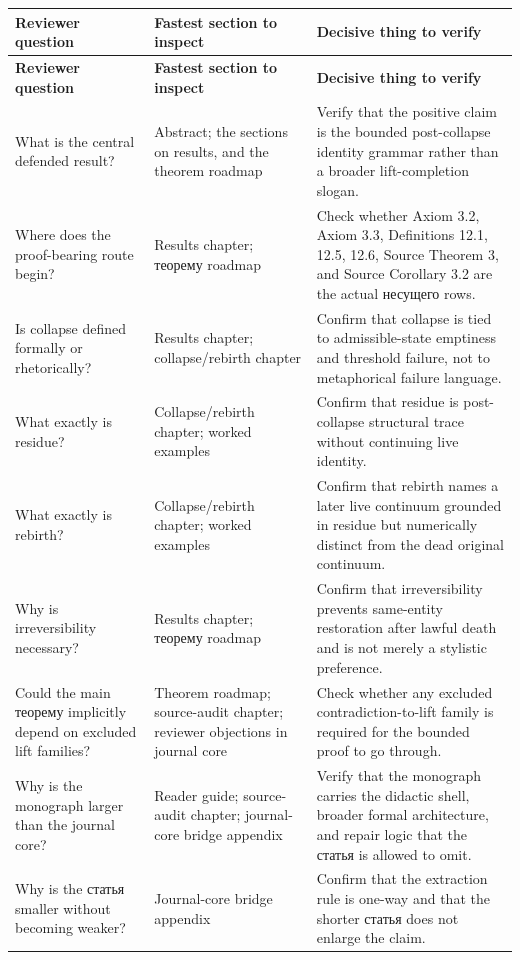 \begin{longtable}{p{3.4cm} p{4.4cm} p{5.7cm}}
\toprule
\textbf{Reviewer question} & \textbf{Fastest section to inspect} & \textbf{Decisive thing to verify} \\
\midrule
\endfirsthead
\toprule
\textbf{Reviewer question} & \textbf{Fastest section to inspect} & \textbf{Decisive thing to verify} \\
\midrule
\endhead
\bottomrule
\endfoot
What is the central defended result? & Abstract; the sections on results, and the theorem roadmap & Verify that the positive claim is the bounded post-collapse identity grammar rather than a broader lift-completion slogan. \\
Where does the proof-bearing route begin? & Results chapter; теорему roadmap & Check whether Axiom 3.2, Axiom 3.3, Definitions 12.1, 12.5, 12.6, Source Theorem 3, and Source Corollary 3.2 are the actual несущего rows. \\
Is collapse defined formally or rhetorically? & Results chapter; collapse/rebirth chapter & Confirm that collapse is tied to admissible-state emptiness and threshold failure, not to metaphorical failure language. \\
What exactly is residue? & Collapse/rebirth chapter; worked examples & Confirm that residue is post-collapse structural trace without continuing live identity. \\
What exactly is rebirth? & Collapse/rebirth chapter; worked examples & Confirm that rebirth names a later live continuum grounded in residue but numerically distinct from the dead original continuum. \\
Why is irreversibility necessary? & Results chapter; теорему roadmap & Confirm that irreversibility prevents same-entity restoration after lawful death and is not merely a stylistic preference. \\
Could the main теорему implicitly depend on excluded lift families? & Theorem roadmap; source-audit chapter; reviewer objections in journal core & Check whether any excluded contradiction-to-lift family is required for the bounded proof to go through. \\
Why is the monograph larger than the journal core? & Reader guide; source-audit chapter; journal-core bridge appendix & Verify that the monograph carries the didactic shell, broader formal architecture, and repair logic that the статья is allowed to omit. \\
Why is the статья smaller without becoming weaker? & Journal-core bridge appendix & Confirm that the extraction rule is one-way and that the shorter статья does not enlarge the claim. \\

\end{longtable}
